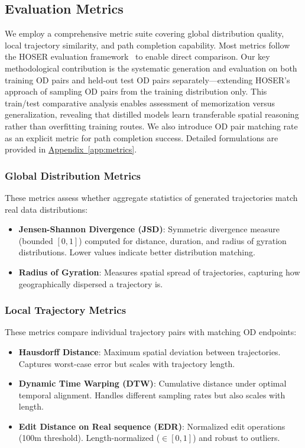 \subsection{Evaluation Metrics}
\label{sec:eval-metrics}

We employ a comprehensive metric suite covering global distribution quality, local trajectory similarity, and path completion capability. Most metrics follow the HOSER evaluation framework~\cite{caoHolisticSemanticRepresentation2025,HOSEREvaluationMainipynb} to enable direct comparison. Our key methodological contribution is the systematic generation and evaluation on both training OD pairs and held-out test OD pairs separately---extending HOSER's approach of sampling OD pairs from the training distribution only. This train/test comparative analysis enables assessment of memorization versus generalization, revealing that distilled models learn transferable spatial reasoning rather than overfitting training routes. We also introduce OD pair matching rate as an explicit metric for path completion success. Detailed formulations are provided in \hyperref[app:metrics]{Appendix~\ref*{app:metrics}}.

\subsubsection{Global Distribution Metrics}

These metrics assess whether aggregate statistics of generated trajectories match real data distributions:

\begin{itemize}[noitemsep,topsep=0pt]
    \item \textbf{Jensen-Shannon Divergence (JSD)}: Symmetric divergence measure (bounded $[0, 1]$) computed for distance, duration, and radius of gyration distributions. Lower values indicate better distribution matching.
    \item \textbf{Radius of Gyration}: Measures spatial spread of trajectories, capturing how geographically dispersed a trajectory is.
\end{itemize}

\subsubsection{Local Trajectory Metrics}

These metrics compare individual trajectory pairs with matching OD endpoints:

\begin{itemize}[noitemsep,topsep=0pt]
    \item \textbf{Hausdorff Distance}: Maximum spatial deviation between trajectories. Captures worst-case error but scales with trajectory length.
    \item \textbf{Dynamic Time Warping (DTW)}: Cumulative distance under optimal temporal alignment. Handles different sampling rates but also scales with length.
    \item \textbf{Edit Distance on Real sequence (EDR)}: Normalized edit operations (100m threshold). Length-normalized ($\in [0,1]$) and robust to outliers.
\end{itemize}

